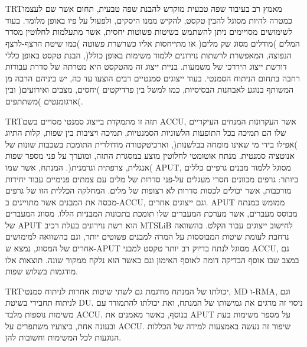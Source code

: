 \documentclass[12pt,a4paper,table]{report}
\newcommand{\heb}[1]{\bgroup\textdir TRT\hebfont #1\egroup}
\begin{document}



\pagebreak
\appendix





\pagebreak

\section*{\flushright{\heb{תקציר}}}

\begin{flushright}
\heb{מאמץ רב בעיבוד שפה טבעית מוקדש להבנת שפה טבעית, תחום אשר שם לעצמו כמטרה להיות מסוגל להבין טקסט,
להקיש ממנו היסקים, ולפעול על פיו באופן מלומד. בעוד לשימושים מסויימים ניתן להשתמש בשיטות פשוטות יחסית,
אשר מתעלמות לחלוטין מסדר המלים )מודלים מסוג שק מלים( או מתייחסות אליו כשרשרת פשוטה
)כמו שיטת הרצף-לרצף הנפוצה, המאפשרת לרשתות נוירונים ללמוד משימות באופן כולל(, הבנת טקסט באופן כללי דורשת
ייצוג היררכי של משמעות. בניית ייצוג זה מהטקסט היא מטרתה של סדרת עבודות רחבה בתחום הניתוח הסמנטי.
בעוד ייצוגים סמנטיים רבים הוצעו עד כה, יש ביניהם הרבה מן המשותף בנוגע לאבחנות הבסיסיות, כמו למשל בין
פרדיקטים )יחסים, מצבים ואירועים( ובין ארגומנטים )משתתפים(.}

\heb{תזה זו מתמקדת בייצוג סמנטי מסויים בשם ACCU, אשר העקרונות המנחים העיקריים שלו הם
תמיכה בכל התופעות הלשוניות הסמנטיות, תמיכה ויציבות בין שפות, קלות התיוג )אפילו בידי מי שאינו מומחה בבלשנות(,
וארכיטקטורה מודולרית התומכת בשכבות שונות של אנוטציה סמנטית.
מנתח אוטומטי לחלוטין מוצע במסגרת התזה, ומוערך על פני מספר שפות )אנגלית, צרפתית וגרמנית(.
המנתח, אשר שמו APUT, מסוגל ללמוד מבנים גרפיים כללים ביותר: גרפים מכוונים חסרי מעגלים על-פני
סדרות של מלים עם צמתים פנימיים עבור יחידות מורכבות, אשר יכולים לכסות סדרות לא רצופות של מלים.
המחלקה הכללית הזו של גרפים מכסה את המבנים אשר מתוייגים ב-ACCU, וגם ייצוגים אחרים.
APUT ממומש כמנתח מבוסס מעברים, אשר מערכת המעברים שלו תומכת בתכונות המבניות הללו.
מסווג המעברים של APUT הוא רשת נוירונים בעלת רכיב MTSLiB לחישוב ייצוגים עבור הקלט.
בהשוואה נרחבת לעומת שיטות המבוססות על המרה למבנים פשוטים יותר, וגם בהשוואה למימושים אחרים של המסווג,
נמצא ש-APUT מסוגל לנתח בדיוק רב יותר טקסט למבני ACCU, גם במצב שבו אוסף הבדיקה דומה לאוסף האימון
וגם כאשר הוא נלקח ממקור שונה. תוצאות אלו מודגמות בשלוש שפות.}

\heb{יכולתו של המנתח מודגמת גם לשתי שיטות אחרות לניתוח סמנטי, MD ו-RMA,
וגם לניתוח תחבירי בשיטת DU. ניסוי זה מדגים את גמישותו של המנתח, ואת יכולתו להתמודד
עם משימות נוספות מלבד ACCU. בנוסף, כאשר מאמנים את APUT על מספר משימות בעת ובעונה אחת,
ביצועיו משתפרים על ACCU. שיפור זה נעשה באמצעות למידה של הכללות הנוגעות לכל המשימות וחשובות להן.}


\end{flushright}
\end{document}
